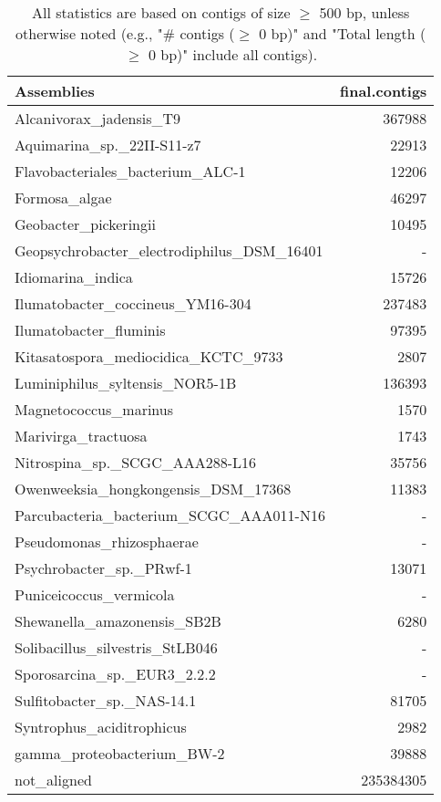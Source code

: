\documentclass[12pt,a4paper]{article}
\begin{document}
\begin{table}[ht]
\begin{center}
\caption{All statistics are based on contigs of size $\geq$ 500 bp, unless otherwise noted (e.g., "\# contigs ($\geq$ 0 bp)" and "Total length ($\geq$ 0 bp)" include all contigs).}
\begin{tabular}{|l*{1}{|r}|}
\hline
Assemblies & final.contigs \\ \hline
Alcanivorax\_jadensis\_T9 & 367988 \\ \hline
Aquimarina\_sp.\_22II-S11-z7 & 22913 \\ \hline
Flavobacteriales\_bacterium\_ALC-1 & 12206 \\ \hline
Formosa\_algae & 46297 \\ \hline
Geobacter\_pickeringii & 10495 \\ \hline
Geopsychrobacter\_electrodiphilus\_DSM\_16401 & - \\ \hline
Idiomarina\_indica & 15726 \\ \hline
Ilumatobacter\_coccineus\_YM16-304 & 237483 \\ \hline
Ilumatobacter\_fluminis & 97395 \\ \hline
Kitasatospora\_mediocidica\_KCTC\_9733 & 2807 \\ \hline
Luminiphilus\_syltensis\_NOR5-1B & 136393 \\ \hline
Magnetococcus\_marinus & 1570 \\ \hline
Marivirga\_tractuosa & 1743 \\ \hline
Nitrospina\_sp.\_SCGC\_AAA288-L16 & 35756 \\ \hline
Owenweeksia\_hongkongensis\_DSM\_17368 & 11383 \\ \hline
Parcubacteria\_bacterium\_SCGC\_AAA011-N16 & - \\ \hline
Pseudomonas\_rhizosphaerae & - \\ \hline
Psychrobacter\_sp.\_PRwf-1 & 13071 \\ \hline
Puniceicoccus\_vermicola & - \\ \hline
Shewanella\_amazonensis\_SB2B & 6280 \\ \hline
Solibacillus\_silvestris\_StLB046 & - \\ \hline
Sporosarcina\_sp.\_EUR3\_2.2.2 & - \\ \hline
Sulfitobacter\_sp.\_NAS-14.1 & 81705 \\ \hline
Syntrophus\_aciditrophicus & 2982 \\ \hline
gamma\_proteobacterium\_BW-2 & 39888 \\ \hline
not\_aligned & 235384305 \\ \hline
\end{tabular}
\end{center}
\end{table}
\end{document}

